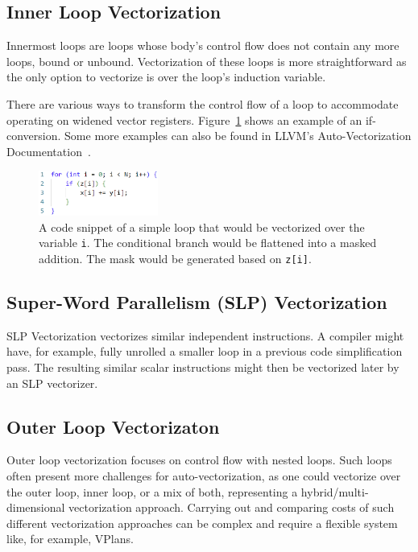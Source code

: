 \documentclass[sigplan,11pt,nonacm]{acmart}
\begin{document}
\subsection{Inner Loop Vectorization}
Innermost loops are loops whose body's control flow does not contain any more loops, bound or unbound.
Vectorization of these loops is more straightforward as the only option to vectorize is over 
the loop's induction variable.

There are various ways to transform the control flow of a loop to accommodate operating on widened
vector registers. Figure~\ref{fig:inner-loop-vec} shows an example of an if-conversion. Some more
examples can also be found in LLVM's Auto-Vectorization Documentation~\cite{llvmvec}.

\begin{figure}
  \centering
  \includegraphics[width=0.35\textwidth]{images/inner-loop-vec.png}
  \caption{A code snippet of a simple loop that would be vectorized over the variable \texttt{i}. 
  The conditional branch would be flattened into a masked addition. The mask would be generated 
  based on \texttt{z[i]}.}
  \label{fig:inner-loop-vec}
\end{figure}

\subsection{Super-Word Parallelism (SLP) Vectorization}
SLP Vectorization vectorizes similar independent instructions. A compiler might have, for example, 
fully unrolled a smaller loop in a previous code simplification pass. The resulting similar scalar 
instructions might then be vectorized later by an SLP vectorizer.

\subsection{Outer Loop Vectorizaton}
Outer loop vectorization focuses on control flow with nested loops. Such loops often present
more challenges for auto-vectorization, as one could vectorize over the outer loop,
inner loop, or a mix of both, representing a hybrid/multi-dimensional vectorization approach. 
Carrying out and comparing costs of such different vectorization approaches can be complex 
and require a flexible system like, for example, VPlans. 
\end{document}
